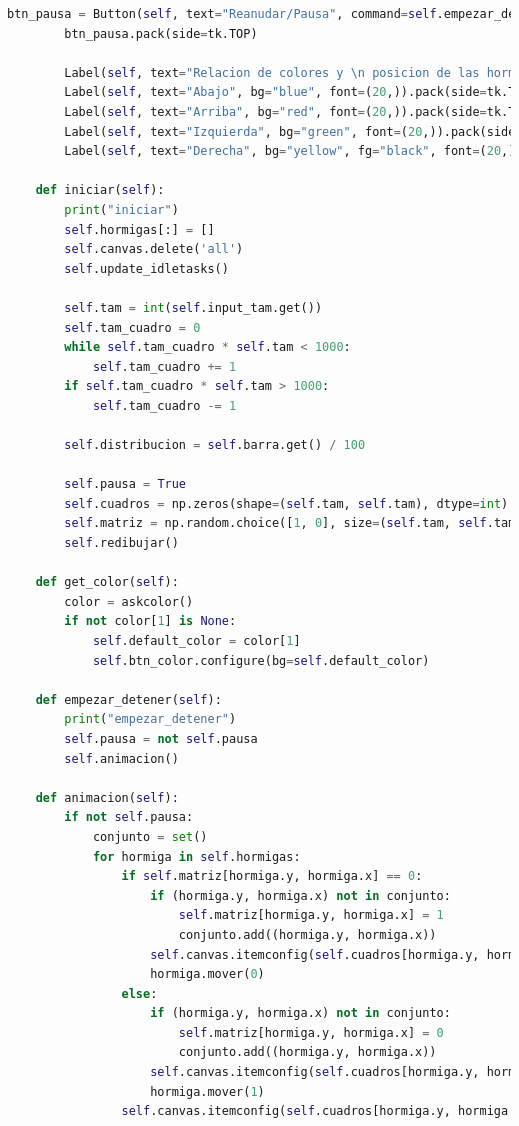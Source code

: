 \begin{lstlisting}[language=Python]
        btn_pausa = Button(self, text="Reanudar/Pausa", command=self.empezar_detener, font=(20,))
        btn_pausa.pack(side=tk.TOP)

        Label(self, text="Relacion de colores y \n posicion de las hormiga:", font=(20,)).pack(side=tk.TOP)
        Label(self, text="Abajo", bg="blue", font=(20,)).pack(side=tk.TOP)
        Label(self, text="Arriba", bg="red", font=(20,)).pack(side=tk.TOP)
        Label(self, text="Izquierda", bg="green", font=(20,)).pack(side=tk.TOP)
        Label(self, text="Derecha", bg="yellow", fg="black", font=(20,)).pack(side=tk.TOP)

    def iniciar(self):
        print("iniciar")
        self.hormigas[:] = []
        self.canvas.delete('all')
        self.update_idletasks()

        self.tam = int(self.input_tam.get())
        self.tam_cuadro = 0
        while self.tam_cuadro * self.tam < 1000:
            self.tam_cuadro += 1
        if self.tam_cuadro * self.tam > 1000:
            self.tam_cuadro -= 1

        self.distribucion = self.barra.get() / 100

        self.pausa = True
        self.cuadros = np.zeros(shape=(self.tam, self.tam), dtype=int)
        self.matriz = np.random.choice([1, 0], size=(self.tam, self.tam), p=[self.distribucion, 1-self.distribucion])
        self.redibujar()

    def get_color(self):
        color = askcolor()
        if not color[1] is None:
            self.default_color = color[1]
            self.btn_color.configure(bg=self.default_color)

    def empezar_detener(self):
        print("empezar_detener")
        self.pausa = not self.pausa
        self.animacion()

    def animacion(self):
        if not self.pausa:
            conjunto = set()
            for hormiga in self.hormigas:
                if self.matriz[hormiga.y, hormiga.x] == 0:
                    if (hormiga.y, hormiga.x) not in conjunto:
                        self.matriz[hormiga.y, hormiga.x] = 1
                        conjunto.add((hormiga.y, hormiga.x))
                    self.canvas.itemconfig(self.cuadros[hormiga.y, hormiga.x], fill=hormiga.color)
                    hormiga.mover(0)
                else:
                    if (hormiga.y, hormiga.x) not in conjunto:
                        self.matriz[hormiga.y, hormiga.x] = 0
                        conjunto.add((hormiga.y, hormiga.x))
                    self.canvas.itemconfig(self.cuadros[hormiga.y, hormiga.x], fill="black")
                    hormiga.mover(1)
                self.canvas.itemconfig(self.cuadros[hormiga.y, hormiga.x], fill=colores_dict[hormiga.orientacion])


\end{lstlisting}
